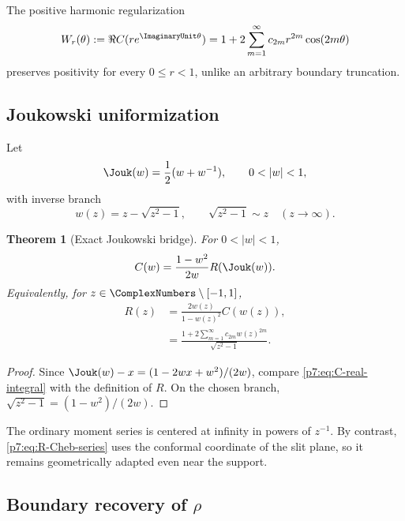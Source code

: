 \documentclass[11pt]{article}
\newtheorem{theorem}{Theorem}[section]
\theoremstyle{definition}
\theoremstyle{remark}
\begin{document}
The positive harmonic regularization
\begin{equation}
 W_r(\theta):=\Re C(re^{\ImaginaryUnit\theta})
 =1+2\sum_{m=1}^{\infty}c_{2m}r^{2m}\cos(2m\theta)
 \label{p7:eq:Wr}
\end{equation}
preserves positivity for every \(0\le r<1\), unlike an arbitrary boundary truncation.

\subsection{Joukowski uniformization}

Let
\begin{equation}
 \Jouk(w)=\frac12(w+w^{-1}),\qquad 0<|w|<1,
 \label{p7:eq:Joukowski}
\end{equation}
with inverse branch
\begin{equation}
 w(z)=z-\sqrt{z^2-1},
 \qquad \sqrt{z^2-1}\sim z\quad(z\to\infty).
 \label{p7:eq:Joukowski-inverse}
\end{equation}

\begin{theorem}[Exact Joukowski bridge]
\label{p7:thm:Joukowski-bridge}
For \(0<|w|<1\),
\begin{equation}
 C(w)=\frac{1-w^2}{2w}R(\Jouk(w)).
 \label{p7:eq:C-R-Jouk}
\end{equation}
Equivalently, for \(z\in\ComplexNumbers\setminus[-1,1]\),
\begin{align}
 R(z)&=\frac{2w(z)}{1-w(z)^2}C(w(z)),
 \label{p7:eq:R-C-w}\\
 &=\frac{1+2\sum_{m=1}^{\infty}c_{2m}w(z)^{2m}}
 {\sqrt{z^2-1}}.
 \label{p7:eq:R-Cheb-series}
\end{align}
\end{theorem}

\begin{proof}
Since \(\Jouk(w)-x=(1-2wx+w^2)/(2w)\), compare \eqref{p7:eq:C-real-integral} with the
definition of \(R\). On the chosen branch, \(\sqrt{z^2-1}=(1-w^2)/(2w)\).
\end{proof}

The ordinary moment series is centered at infinity in powers of \(z^{-1}\). By contrast,
\eqref{p7:eq:R-Cheb-series} uses the conformal coordinate of the slit plane, so it remains
geometrically adapted even near the support.

\subsection[Boundary recovery of rho]{Boundary recovery of \(\rho\)}
\end{document}
